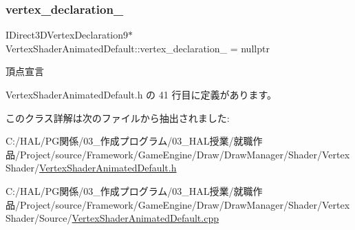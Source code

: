 \subsubsection{\texorpdfstring{vertex\+\_\+declaration\+\_\+}{vertex\_declaration\_}}
{\footnotesize\ttfamily I\+Direct3\+D\+Vertex\+Declaration9$\ast$ Vertex\+Shader\+Animated\+Default\+::vertex\+\_\+declaration\+\_\+ = nullptr\hspace{0.3cm}{\ttfamily [private]}}



頂点宣言 



 Vertex\+Shader\+Animated\+Default.\+h の 41 行目に定義があります。



このクラス詳解は次のファイルから抽出されました\+:\begin{DoxyCompactItemize}
\item 
C\+:/\+H\+A\+L/\+P\+G関係/03\+\_\+作成プログラム/03\+\_\+\+H\+A\+L授業/就職作品/\+Project/source/\+Framework/\+Game\+Engine/\+Draw/\+Draw\+Manager/\+Shader/\+Vertex\+Shader/\mbox{\hyperlink{_vertex_shader_animated_default_8h}{Vertex\+Shader\+Animated\+Default.\+h}}\item 
C\+:/\+H\+A\+L/\+P\+G関係/03\+\_\+作成プログラム/03\+\_\+\+H\+A\+L授業/就職作品/\+Project/source/\+Framework/\+Game\+Engine/\+Draw/\+Draw\+Manager/\+Shader/\+Vertex\+Shader/\+Source/\mbox{\hyperlink{_vertex_shader_animated_default_8cpp}{Vertex\+Shader\+Animated\+Default.\+cpp}}\end{DoxyCompactItemize}
